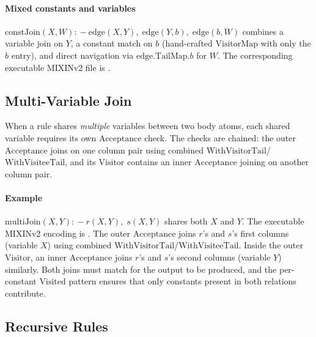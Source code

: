 \paragraph{Mixed constants and variables}
$\mathrm{constJoin}(X, W) \mathrel{{:}\!{-}} \mathrm{edge}(X, Y),\; \mathrm{edge}(Y, b),\; \mathrm{edge}(b, W)$
combines a variable join on $Y$, a constant match on $b$
(hand-crafted $\mathrm{VisitorMap}$ with only the $b$ entry),
and direct navigation via $\mathrm{edge}.\mathrm{TailMap}.b$
for $W$.
The corresponding executable MIXINv2 file is
.

\subsection{Multi-Variable Join}

When a rule shares \emph{multiple} variables between two
body atoms, each shared variable requires its own
$\mathrm{Acceptance}$ check.
The checks are chained: the outer $\mathrm{Acceptance}$
joins on one column pair using combined
$\mathrm{WithVisitorTail}$/$\mathrm{WithVisiteeTail}$, and
its $\mathrm{Visitor}$ contains an inner $\mathrm{Acceptance}$
joining on another column pair.

\paragraph{Example}
$\mathrm{multiJoin}(X, Y) \mathrel{{:}\!{-}} r(X, Y),\; s(X, Y)$
shares both $X$ and $Y$.
The executable MIXINv2 encoding is
.
The outer $\mathrm{Acceptance}$ joins $r$'s and $s$'s first
columns (variable $X$) using combined
$\mathrm{WithVisitorTail}$/$\mathrm{WithVisiteeTail}$.
Inside the outer $\mathrm{Visitor}$, an inner
$\mathrm{Acceptance}$ joins $r$'s and $s$'s second columns
(variable $Y$) similarly.
Both joins must match for the output to be produced, and
the per-constant $\mathrm{Visited}$ pattern ensures that
only constants present in both relations contribute.

\subsection{Recursive Rules}
\label{sec:recursive-rules}

